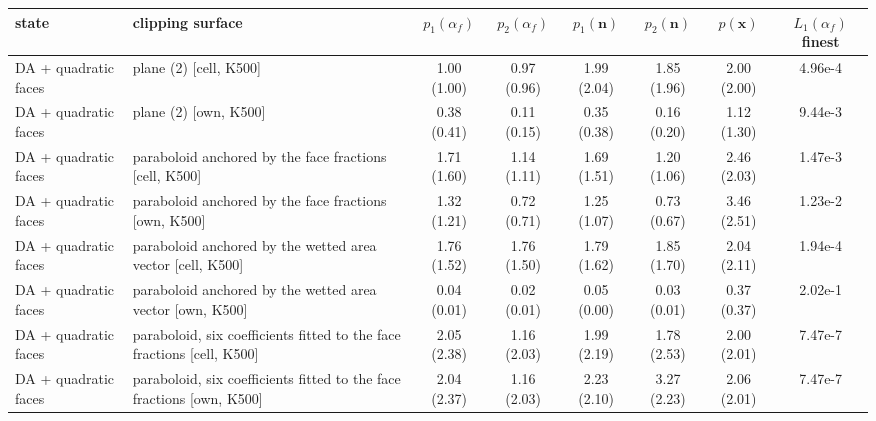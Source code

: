 \begin{tabular}{llcccccc}
\toprule
state & clipping surface & $p_1(\alpha_f)$ & $p_2(\alpha_f)$ & $p_1(\mathbf{n})$ & $p_2(\mathbf{n})$ & $p(\mathbf{x})$ & $L_1(\alpha_f)$ finest \\
\midrule
DA + quadratic faces & plane (2) [cell, K500] & 1.00 (1.00) & 0.97 (0.96) & 1.99 (2.04) & 1.85 (1.96) & 2.00 (2.00) & 4.96e-4 \\
DA + quadratic faces & plane (2) [own, K500] & 0.38 (0.41) & 0.11 (0.15) & 0.35 (0.38) & 0.16 (0.20) & 1.12 (1.30) & 9.44e-3 \\
DA + quadratic faces & paraboloid anchored by the face fractions [cell, K500] & 1.71 (1.60) & 1.14 (1.11) & 1.69 (1.51) & 1.20 (1.06) & 2.46 (2.03) & 1.47e-3 \\
DA + quadratic faces & paraboloid anchored by the face fractions [own, K500] & 1.32 (1.21) & 0.72 (0.71) & 1.25 (1.07) & 0.73 (0.67) & 3.46 (2.51) & 1.23e-2 \\
DA + quadratic faces & paraboloid anchored by the wetted area vector [cell, K500] & 1.76 (1.52) & 1.76 (1.50) & 1.79 (1.62) & 1.85 (1.70) & 2.04 (2.11) & 1.94e-4 \\
DA + quadratic faces & paraboloid anchored by the wetted area vector [own, K500] & 0.04 (0.01) & 0.02 (0.01) & 0.05 (0.00) & 0.03 (0.01) & 0.37 (0.37) & 2.02e-1 \\
DA + quadratic faces & paraboloid, six coefficients fitted to the face fractions [cell, K500] & 2.05 (2.38) & 1.16 (2.03) & 1.99 (2.19) & 1.78 (2.53) & 2.00 (2.01) & 7.47e-7 \\
DA + quadratic faces & paraboloid, six coefficients fitted to the face fractions [own, K500] & 2.04 (2.37) & 1.16 (2.03) & 2.23 (2.10) & 3.27 (2.23) & 2.06 (2.01) & 7.47e-7 \\
\bottomrule
\end{tabular}
